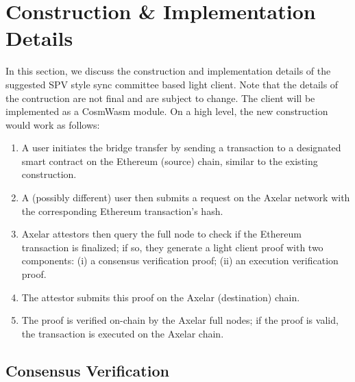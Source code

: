 \section{Construction \& Implementation Details}

In this section, we discuss the construction and implementation details 
of the suggested SPV style sync committee based light client. Note that the details of 
the contruction are not final and are subject to change. The client will be implemented 
as a CosmWasm module. On a high level, the new construction would work as follows:
\begin{enumerate}
    \item A user initiates the bridge transfer by sending a transaction to a
        designated smart contract on the Ethereum (source) chain, similar to
        the existing construction.
    \item A (possibly different) user then submits a request on the Axelar
        network with the corresponding Ethereum transaction's hash.
    \item Axelar attestors then query the full node to check if the Ethereum
        transaction is finalized; if so, they generate a light client proof with
        two components: (i) a consensus verification proof; (ii) an
        execution verification proof.
    \item The attestor submits this proof on the Axelar (destination)
        chain.
    \item The proof is verified on-chain by the Axelar full nodes; if the proof
        is valid, the transaction is executed on the Axelar chain.
\end{enumerate}

\subsection{Consensus Verification}

